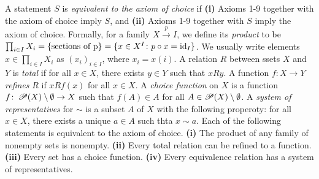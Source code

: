  A statement $S$ is \textit{equivalent to the axiom of choice} if \textbf{(i)} Axioms 1-9 together with the axiom of choice imply $S$, and \textbf{(ii)} Axioms 1-9 together with $S$ imply the axiom of choice.
 Formally, for a family $X \xrightarrow{p} I$, we define its \textit{product} to be $\prod_{i \in I} X_i = \{ \text{sections of p} \} = \{ x \in X^I \colon p \circ x = \operatorname{id}_I \}$. We usually write elements $x \in \prod_{i \in I} X_i$ as $(x_i)_{i \in I}$, where $x_i = x(i)$.
 A relation $R$ between ssets $X$ and $Y$ is \textit{total} if for all $x \in X$, there exists $y \in Y$ such that $xRy$.
 A function $f \colon X \to Y$ \textit{refines} $R$ if $xRf(x)$ for all $x \in X$.
 A \textit{choice function} on $X$ is a function $f \colon \operatorname{\mathscr{P}}(X) \setminus \emptyset \to X$ such that $f(A) \in A$ for all $A \in \operatorname{\mathscr{P}}(X) \setminus \emptyset$.
 A \textit{system of representatives} for $\sim$ is a subset $A$ of $X$ with the following properoty: for all $x \in X$, there exists a unique $a \in A$ such thta $x \sim a$.
  Each of the following statements is equivalent to the axiom of choice. \textbf{(i)} The product of any family of nonempty sets is nonempty. \textbf{(ii)} Every total relation can be refined to a function. \textbf{(iii)} Every set has a choice function. \textbf{(iv)} Every equivalence relation has a system of representatives.
